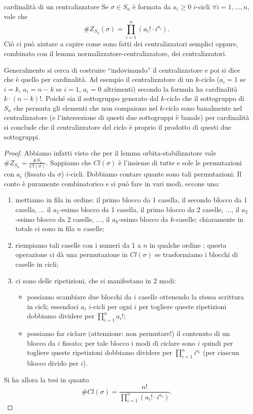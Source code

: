 \begin{proposition}{cardinalità di un centralizzatore}
    Se $\sigma \in S_n$ è formata da $a_i \geq 0$ $i$-cicli $\forall i = 1,\dots,n$, vale che \[ \#Z_{S_n}(\sigma) = \prod_{i=1}^n (a_i!\cdot i^{a_i}). \]
    Ciò ci può aiutare a capire come sono fatti dei centralizzatori semplici oppure, combinato con il lemma normalizzatore-centralizzatore, dei centralizzatori.
    
    Generalmente si cerca di costruire ``indovinando'' il centralizzatore e poi si dice che è quello per cardinalità. Ad esempio il centralizzatore di un $k$-ciclo ($a_i = 1$ se $i = k$, $a_i = n-k$ se $i = 1$, $a_i = 0$ altrimenti) secondo la formula ha cardinalità $k \cdot (n-k)!$. Poiché sia il sottogruppo generato dal $k$-ciclo che il sottogruppo di $S_n$ che permuta gli elementi che non compaiono nel $k$-ciclo sono banalmente nel centralizzatore (e l'intersezione di questi due sottogruppi è banale) per cardinalità si conclude che il centralizzatore del ciclo è proprio il prodotto di questi due sottogruppi. 
\end{proposition}
\begin{proof}
    Abbiamo infatti visto che per il lemma orbita-stabilizzatore vale $\#Z_{S_n} = \frac{\#S_n}{Cl(\sigma)}$. Sappiamo che $Cl(\sigma)$ è l'insieme di tutte e sole le permutazioni con $a_i$ (fissato da $\sigma$) $i$-cicli. Dobbiamo contare quante sono tali permutazioni. Il conto è puramente combinatorico e si può fare in vari modi, eccone uno: 
    \begin{enumerate}
        \item mettiamo in fila in ordine: il primo blocco da 1 casella, il secondo blocco da 1 casella, $\dots$ il $a_1$-esimo blocco da 1 casella, il primo blocco da 2 caselle, $\dots$, il $a_2$-esimo blocco da 2 caselle, $\dots$, il $a_k$-esimo blocco da $k$-caselle; chiaramente in totale ci sono in fila $n$ caselle;
        \item riempiamo tali caselle con i numeri da 1 a $n$ in qualche ordine ; questa operazione ci dà una permutazione in $Cl(\sigma)$ se trasformiamo i blocchi di caselle in cicli;
        \item ci sono delle ripetizioni, che si manifestano in 2 modi:
        \begin{itemize}
            \item possiamo scambiare due blocchi da $i$ caselle ottenendo la stessa scrittura in cicli; essendoci $a_i$ $i$-cicli per ogni $i$ per togliere queste ripetizioni dobbiamo dividere per $\prod_{i=1}^n a_i!$;
            \item possiamo far ciclare (attenzione: non permutare!) il contenuto di un blocco da $i$ fissato; per tale blocco i modi di ciclare sono $i$ quindi per togliere queste ripetizioni dobbiamo dividere per $\prod_{i=1}^n i^{a_i}$ (per ciascun blocco divido per $i$).
        \end{itemize}
    \end{enumerate}
    Si ha allora la tesi in quanto \[ \#Cl(\sigma) = \frac{n!}{\prod_{i=1}^n (a_i!\cdot i^{a_i})}. \]
\end{proof}
